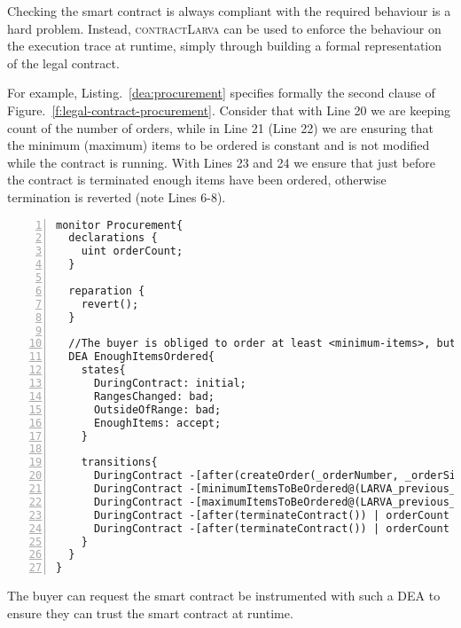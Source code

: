 \documentclass{article}
\newcommand{\contractlarva}{\textsc{contractLarva}\xspace}
\newcommand{\tildearrow}{{\raise.37ex\hbox{$\scriptstyle\mathtt{\sim}$}}\hspace{-0.08cm}>\xspace}
\begin{document}
   Checking the smart contract is always compliant with the required behaviour is a hard problem. Instead, \contractlarva can be used to enforce the behaviour on the execution trace at runtime, simply through building a formal representation of the legal contract. 
   
   For example, Listing.~\ref{dea:procurement} specifies formally the second clause of Figure.~\ref{f:legal-contract-procurement}. Consider that with Line 20 we are keeping count of the number of orders, while in Line 21 (Line 22) we are ensuring that the minimum (maximum) items to be ordered is constant and is not modified while the contract is running. With Lines 23 and 24 we ensure that just before the contract is terminated enough items have been ordered, otherwise termination is reverted (note Lines 6-8). 
     
     \small\begin{lstlisting}[language=DEA,basicstyle=\scriptsize,numbers=left,numbersep=2pt,xleftmargin=0.3cm,escapechar=\%,label={dea:procurement},caption={Monitor specification that checks whether the number of items ordered is within the minimum and maximum required.}]
monitor Procurement{
  declarations {
    uint orderCount;
  }

  reparation {
    revert(); 
  }

  //The buyer is obliged to order at least <minimum-items>, but no more than <maximum-items> items for a fixed price <price> before the termination of this contract.
  DEA EnoughItemsOrdered{
    states{
      DuringContract: initial;
      RangesChanged: bad;
      OutsideOfRange: bad;
      EnoughItems: accept;
    }

    transitions{
      DuringContract -[after(createOrder(_orderNumber, _orderSize, _orderDeliveryTimeLeft)) | %$\tildearrow$% orderCount += _orderNumber;]-> DuringContract;
      DuringContract -[minimumItemsToBeOrdered@(LARVA_previous_minimumItemsToBeOrdered != minimumItemsToBeOrdered)]-> RangesChanged;
      DuringContract -[maximumItemsToBeOrdered@(LARVA_previous_minimumItemsToBeOrdered != minimumItemsToBeOrdered)]-> RangesChanged;
      DuringContract -[after(terminateContract()) | orderCount < minimumItemsToBeOrdered || orderCount > maximumItemsToBeOrdered]-> OutsideOfRange;
      DuringContract -[after(terminateContract()) | orderCount >= minimumItemsToBeOrdered && orderCount <= maximumItemsToBeOrdered]-> EnoughItems;
    }
  }
}
    \end{lstlisting}\normalsize
    
    The buyer can request the smart contract be instrumented with such a DEA to ensure they can trust the smart contract at runtime.
    
\end{document}
